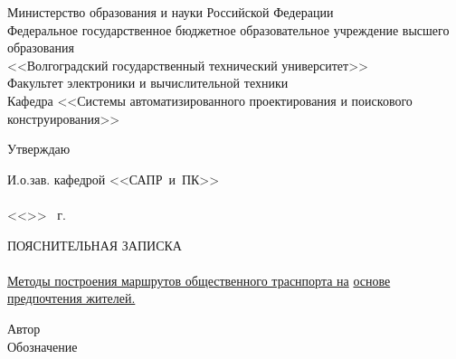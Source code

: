 \begin{titlepage}
    \begin{center}
        Министерство образования и науки Российской Федерации \\
        Федеральное государственное бюджетное образовательное учреждение высшего образования\\
        <<Волгоградский государственный технический университет>>\\
        Факультет электроники и вычислительной техники\\
        Кафедра <<Системы автоматизированного проектирования и поискового конструирования>>
    \end{center}
    \begin{flushright}
        \begin{center}
            \hspace*{9.7em}Утверждаю
        \end{center}
        И.о.зав. кафедрой <<САПР~и~ПК>>\\
        \hspace{0.5em}\\
        \vspace{0.5em}<<\underline{\hspace{2.5em}}>> \underline{\hspace{8.5em}} \the\year\ г.
    \end{flushright}
    \begin{center}
        \large ПОЯСНИТЕЛЬНАЯ ЗАПИСКА\\
            {}\\
        \underline{Методы построения маршрутов общественного траснпорта на\hspace{1.3em}}
        \underline{основе предпочтения жителей.\hspace{0.525\textwidth}}
    \end{center}
    Автор  \quad 
    \\
    Обозначение 

\end{titlepage}
